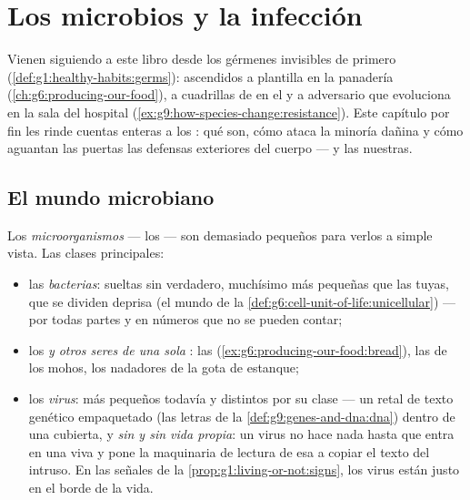 \chapter{Los microbios y la infección}\label{ch:g9:microbes-and-infection}

Vienen siguiendo a este libro desde los gérmenes invisibles de primero
(\cref{def:g1:healthy-habits:germs}): ascendidos a plantilla en la
panadería (\cref{ch:g6:producing-our-food}), a cuadrillas de
 en el  y a adversario que evoluciona en la sala
del hospital (\cref{ex:g9:how-species-change:resistance}). Este
capítulo por fin les rinde cuentas enteras a los : qué son,
cómo ataca la minoría dañina y cómo aguantan las puertas las defensas
exteriores del cuerpo --- y las nuestras.

\section{El mundo microbiano}

\begin{definition}\label{def:g9:microbes-and-infection:sorted}
Los \emph{microorganismos} --- los  ---
son  demasiado pequeños para verlos a simple vista. Las
clases principales:
\begin{itemize}
  \item las \emph{bacterias}:  sueltas sin
         verdadero, muchísimo más pequeñas que las tuyas, que se
        dividen deprisa (el mundo de la
        \cref{def:g6:cell-unit-of-life:unicellular}) --- por todas
        partes y en números que no se pueden contar;
  \item los \emph{ y otros seres de una sola }: las
         (\cref{ex:g6:producing-our-food:bread}), las 
        de los mohos, los nadadores de la gota de estanque;
  \item los \emph{virus}: más pequeños todavía y
        distintos por su clase --- un retal de texto genético
        empaquetado (las letras de la
        \cref{def:g9:genes-and-dna:dna}) dentro de una cubierta, y
        \emph{sin  y sin vida propia}: un virus no hace nada
        hasta que entra en una  viva y pone la maquinaria de
        lectura de esa  a copiar el texto del intruso. En las
        señales de la \cref{prop:g1:living-or-not:signs}, los virus
        están justo en el borde de la vida.
\end{itemize}
\end{definition}

